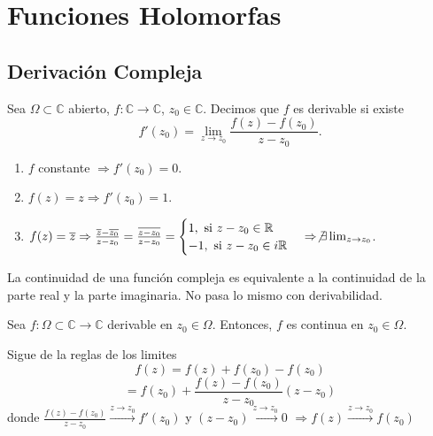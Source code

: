 \chapter{Funciones Holomorfas}
\section{Derivación Compleja}

\begin{defn}[Derivada]
  Sea $\Omega \subset \mathbb{C}$ abierto, $ f: \mathbb{C} \to \mathbb{C}$, $z_{0} \in \mathbb{C}$. Decimos que $f$ es derivable si existe 
  \[ 
     f'(z_{0}) = \lim_{z \to z_{0}} \frac{f(z) - f(z_{0})}{z - z_{0}}. 
  \] 
\end{defn}

\begin{ejm}
  \begin{enumerate}[label=(\roman*)]
    \item $f$ constante $\Rightarrow f'(z_{0}) = 0$.
    \item $f(z) = z \Rightarrow f'(z_{0}) = 1$.
    \item $f(z) = \overline{z} \Rightarrow \frac{\overline{z} - \overline{z_{0}}}{z - z_{0}} = \frac{\overline{z - z_{0}}}{z - z_{0}} =
    \begin{cases}
      1, \text{ si } z - z_{0} \in \mathbb{R} \\
      -1, \text{ si } z - z_{0} \in i \mathbb{R}
    \end{cases}
    \Rightarrow \not \exists \lim_{z \to z_{0}}$.
  \end{enumerate}
\end{ejm}

\begin{obs}
  La continuidad de una función compleja es equivalente a la continuidad de la parte real y la parte imaginaria. No pasa lo mismo con derivabilidad.
\end{obs}

\begin{prop}
  Sea $f: \Omega \subset \mathbb{C} \to \mathbb{C}$ derivable en $z_{0} \in \Omega$. Entonces, $f$ es continua en $z_{0} \in \Omega$.
\end{prop}

\begin{dem}
  Sigue de la reglas de los limites
  \[ 
    f(z) = f(z) + f(z_{0}) - f(z_{0}) 
  \] 
  \[ 
    = f(z_{0}) + \frac{f(z) - f(z_{0})}{z - z_{0}}(z - z_{0}) 
  \] 
  donde $\frac{f(z) - f(z_{0})}{z - z_{0}} \xrightarrow[]{z \rightarrow z_{0}} f'(z_{0})$ y $(z - z_{0}) \xrightarrow[]{z \rightarrow z_{0}} 0$ $\Rightarrow f(z) \xrightarrow[]{z \rightarrow z_{0}} f(z_{0})$
\end{dem}

